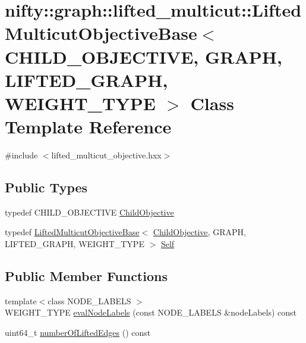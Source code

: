 \hypertarget{classnifty_1_1graph_1_1lifted__multicut_1_1LiftedMulticutObjectiveBase}{}\section{nifty\+:\+:graph\+:\+:lifted\+\_\+multicut\+:\+:Lifted\+Multicut\+Objective\+Base$<$ C\+H\+I\+L\+D\+\_\+\+O\+B\+J\+E\+C\+T\+I\+V\+E, G\+R\+A\+P\+H, L\+I\+F\+T\+E\+D\+\_\+\+G\+R\+A\+P\+H, W\+E\+I\+G\+H\+T\+\_\+\+T\+Y\+P\+E $>$ Class Template Reference}
\label{classnifty_1_1graph_1_1lifted__multicut_1_1LiftedMulticutObjectiveBase}


{\ttfamily \#include $<$lifted\+\_\+multicut\+\_\+objective.\+hxx$>$}

\subsection*{Public Types}
\begin{DoxyCompactItemize}
\item 
typedef C\+H\+I\+L\+D\+\_\+\+O\+B\+J\+E\+C\+T\+I\+V\+E \hyperlink{classnifty_1_1graph_1_1lifted__multicut_1_1LiftedMulticutObjectiveBase_a72e88672e37520bf7bb8bb68a91687ae}{Child\+Objective}
\item 
typedef \hyperlink{classnifty_1_1graph_1_1lifted__multicut_1_1LiftedMulticutObjectiveBase}{Lifted\+Multicut\+Objective\+Base}$<$ \hyperlink{classnifty_1_1graph_1_1lifted__multicut_1_1LiftedMulticutObjectiveBase_a72e88672e37520bf7bb8bb68a91687ae}{Child\+Objective}, G\+R\+A\+P\+H, L\+I\+F\+T\+E\+D\+\_\+\+G\+R\+A\+P\+H, W\+E\+I\+G\+H\+T\+\_\+\+T\+Y\+P\+E $>$ \hyperlink{classnifty_1_1graph_1_1lifted__multicut_1_1LiftedMulticutObjectiveBase_a5da49e6ae096c39a6832883e8a1abd21}{Self}
\end{DoxyCompactItemize}
\subsection*{Public Member Functions}
\begin{DoxyCompactItemize}
\item 
{\footnotesize template$<$class N\+O\+D\+E\+\_\+\+L\+A\+B\+E\+L\+S $>$ }\\W\+E\+I\+G\+H\+T\+\_\+\+T\+Y\+P\+E \hyperlink{classnifty_1_1graph_1_1lifted__multicut_1_1LiftedMulticutObjectiveBase_a281862d2a18218ae1dc14a6b1870c99f}{eval\+Node\+Labels} (const N\+O\+D\+E\+\_\+\+L\+A\+B\+E\+L\+S \&node\+Labels) const 
\item 
uint64\+\_\+t \hyperlink{classnifty_1_1graph_1_1lifted__multicut_1_1LiftedMulticutObjectiveBase_acdf3306f2d2755d955f74e90cd7aade9}{number\+Of\+Lifted\+Edges} () const 
\end{DoxyCompactItemize}


